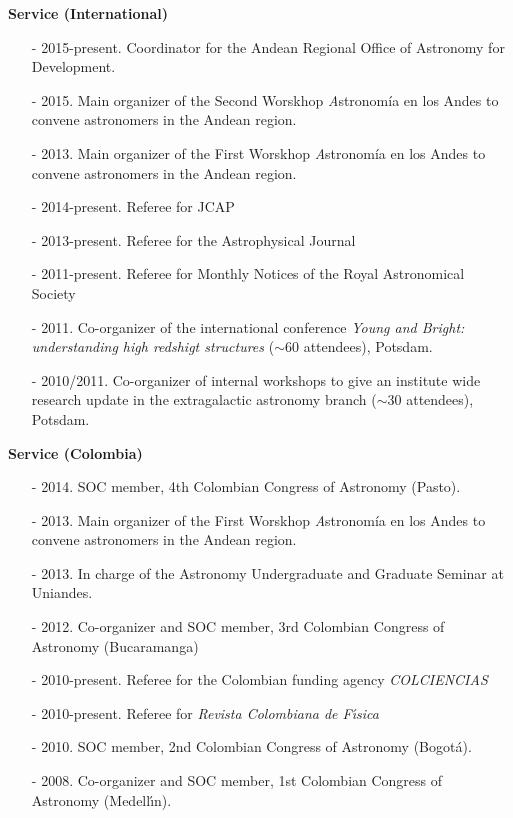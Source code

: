 \documentclass[letterpaper,11pt,onecolumn]{article}
\begin{document}
{\bf Service (International)}
\begin{itemize}
\item[-] 2015-present. Coordinator for the Andean Regional Office of
  Astronomy for Development.
\item[-] 2015. Main organizer of the Second Worskhop {\textit Astronom\'ia en
  los Andes} to convene astronomers in the Andean region.  
\item[-] 2013. Main organizer of the First Worskhop {\textit Astronom\'ia en
  los Andes} to convene astronomers in the Andean region.  
\item[-] 2014-present. Referee for JCAP  %
\item[-] 2013-present. Referee for the Astrophysical Journal %
\item[-] 2011-present. Referee for Monthly Notices of the Royal
  Astronomical Society %
\item[-] 2011. Co-organizer of the international conference {\it Young
  and Bright: understanding high redshigt structures} ($\sim 60$
  attendees), Potsdam. 
\item[-] 2010/2011. Co-organizer of internal workshops to give an
  institute wide research update in the extragalactic astronomy branch
  ($\sim 30$ attendees), Potsdam. 
\end{itemize}

{\bf Service (Colombia)}
\begin{itemize}

\item[-] 2014. SOC member, 4th Colombian Congress of   Astronomy (Pasto). 
\item[-] 2013. Main organizer of the First Worskhop {\textit Astronom\'ia en
  los Andes} to convene astronomers in the Andean region.  
\item[-] 2013. In charge of the Astronomy Undergraduate and Graduate Seminar at Uniandes. 
\item[-] 2012. Co-organizer and SOC member, 3rd Colombian Congress of
  Astronomy (Bucaramanga) 
\item[-] 2010-present. Referee for the Colombian funding agency {\it
  COLCIENCIAS} %
\item[-] 2010-present. Referee for {\it Revista Colombiana de
  F\'{\i}sica} %
\item[-] 2010. SOC member, 2nd Colombian Congress of Astronomy (Bogot\'a).
\item[-] 2008. Co-organizer and SOC member, 1st Colombian Congress of
  Astronomy (Medell\'{\i}n). 
\end{itemize}
\end{document}

